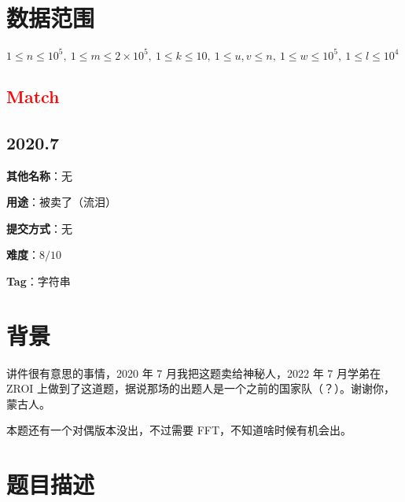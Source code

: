 \documentclass[a4paper,10pt]{article}
\begin{document}
\section*{数据范围}

$1\leq n\leq 10^5,\ 1\leq m\leq 2\times 10^5,\ 1\leq k\leq 10,\ 1\leq u,v\leq n,\ 1\leq w\leq 10^5,\ 1\leq l\leq 10^4$

\newpage

\vspace*{\fill}
\begin{center}

\section{\textcolor{red}{Match}}

\subsection*{2020.7}

\vspace{10pt}

\textbf{其他名称}：无

\vspace{10pt}

\textbf{用途}：被卖了（流泪）

\vspace{10pt}

\textbf{提交方式}：无

\vspace{10pt}

\textbf{难度}：$8/10$

\vspace{10pt}

\textbf{Tag}：字符串

\end{center}
\vspace*{\fill}

\newpage

\section*{背景}

讲件很有意思的事情，2020 年 7 月我把这题卖给神秘人，2022 年 7 月学弟在 ZROI 上做到了这道题，据说那场的出题人是一个之前的国家队（？）。谢谢你，蒙古人。

本题还有一个对偶版本没出，不过需要 FFT，不知道啥时候有机会出。

\section*{题目描述}
\end{document}
